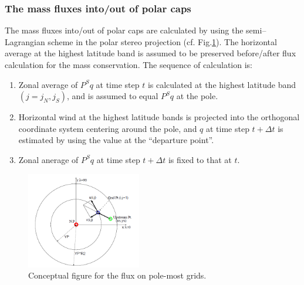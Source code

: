 \documentclass{article}
\begin{document}
\subsubsection{The mass fluxes into/out of polar caps}
The mass fluxes into/out of polar caps are calculated by using the semi–Lagrangian scheme in the polar stereo projection (cf. Fig.\ref{f2}).
The horizontal average at the highest latitude band is assumed to be preserved before/after flux calculation for the mass conservation. The sequence of calculation is:
\begin{enumerate}
\item Zonal average of $P^{S}q$ at time step $t$ is calculated at the highest latitude band $(j=j_{N},j_{S})$, and is assumed to equal $P^{S}q$ at the pole.
\item Horizontal wind at the highest latitude bands is projected into the orthogonal coordinate system centering around the pole, and $q$ at time step $t + \Delta t$ is estimated by using the value at the “departure point”.
\item Zonal anerage of $P^{S}q$ at time step $t+\Delta t$ is fixed to that at $t$.
\end{enumerate}

\begin{figure}
  \centering
  \includegraphics[width=5cm]{polar_tracer_advection.png}
  \caption{Conceptual figure for the flux on pole-most grids.}
  \label{f2}
\end{figure}
\end{document}
